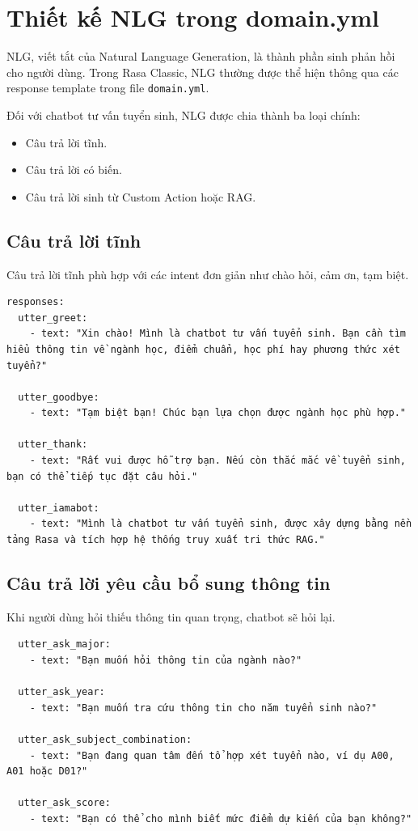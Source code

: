 ﻿\section{Thiết kế NLG trong domain.yml}

NLG, viết tắt của Natural Language Generation, là thành phần sinh phản hồi cho người dùng. Trong Rasa Classic, NLG thường được thể hiện thông qua các response template trong file \texttt{domain.yml}.

Đối với chatbot tư vấn tuyển sinh, NLG được chia thành ba loại chính:
\begin{itemize}
    \item Câu trả lời tĩnh.
    \item Câu trả lời có biến.
    \item Câu trả lời sinh từ Custom Action hoặc RAG.
\end{itemize}

\subsection*{Câu trả lời tĩnh}

Câu trả lời tĩnh phù hợp với các intent đơn giản như chào hỏi, cảm ơn, tạm biệt.

\begin{verbatim}
responses:
  utter_greet:
    - text: "Xin chào! Mình là chatbot tư vấn tuyển sinh. Bạn cần tìm hiểu thông tin về ngành học, điểm chuẩn, học phí hay phương thức xét tuyển?"

  utter_goodbye:
    - text: "Tạm biệt bạn! Chúc bạn lựa chọn được ngành học phù hợp."

  utter_thank:
    - text: "Rất vui được hỗ trợ bạn. Nếu còn thắc mắc về tuyển sinh, bạn có thể tiếp tục đặt câu hỏi."

  utter_iamabot:
    - text: "Mình là chatbot tư vấn tuyển sinh, được xây dựng bằng nền tảng Rasa và tích hợp hệ thống truy xuất tri thức RAG."
\end{verbatim}

\subsection*{Câu trả lời yêu cầu bổ sung thông tin}

Khi người dùng hỏi thiếu thông tin quan trọng, chatbot sẽ hỏi lại.

\begin{verbatim}
  utter_ask_major:
    - text: "Bạn muốn hỏi thông tin của ngành nào?"

  utter_ask_year:
    - text: "Bạn muốn tra cứu thông tin cho năm tuyển sinh nào?"

  utter_ask_subject_combination:
    - text: "Bạn đang quan tâm đến tổ hợp xét tuyển nào, ví dụ A00, A01 hoặc D01?"

  utter_ask_score:
    - text: "Bạn có thể cho mình biết mức điểm dự kiến của bạn không?"
\end{verbatim}

